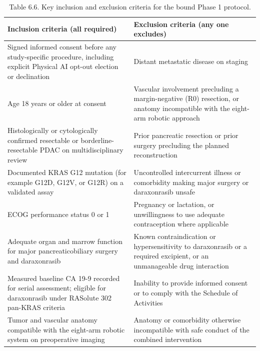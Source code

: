 \begin{table}[t]
\caption{Table 6.6. Key inclusion and exclusion criteria for the bound Phase 1
protocol.}
\label{tab:sec06-eligibility}
\centering
\begin{tabularx}{\textwidth}{Y Y}
\toprule
\textbf{Inclusion criteria (all required)} & \textbf{Exclusion criteria (any one excludes)} \\
\midrule
Signed informed consent before any study-specific procedure, including explicit Physical AI opt-out election or declination & Distant metastatic disease on staging \\
Age 18 years or older at consent & Vascular involvement precluding a margin-negative (R0) resection, or anatomy incompatible with the eight-arm robotic approach \\
Histologically or cytologically confirmed resectable or borderline-resectable PDAC on multidisciplinary review & Prior pancreatic resection or prior surgery precluding the planned reconstruction \\
Documented KRAS G12 mutation (for example G12D, G12V, or G12R) on a validated assay & Uncontrolled intercurrent illness or comorbidity making major surgery or daraxonrasib unsafe \\
ECOG performance status 0 or 1 & Pregnancy or lactation, or unwillingness to use adequate contraception where applicable \\
Adequate organ and marrow function for major pancreaticobiliary surgery and daraxonrasib & Known contraindication or hypersensitivity to daraxonrasib or a required excipient, or an unmanageable drug interaction \\
Measured baseline CA 19-9 recorded for serial assessment; eligible for daraxonrasib under RASolute 302 pan-KRAS criteria & Inability to provide informed consent or to comply with the Schedule of Activities \\
Tumor and vascular anatomy compatible with the eight-arm robotic system on preoperative imaging & Anatomy or comorbidity otherwise incompatible with safe conduct of the combined intervention \\
\bottomrule
\end{tabularx}
\end{table}


